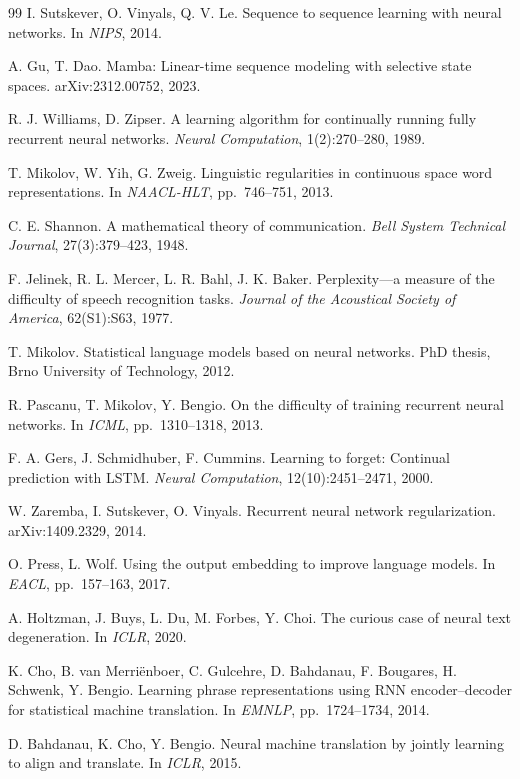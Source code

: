 \documentclass[11pt,a4paper]{article}
\begin{document}
\begin{thebibliography}{99}
 I. Sutskever, O. Vinyals, Q. V. Le.
Sequence to sequence learning with neural networks.
In \emph{NIPS}, 2014.

 A. Gu, T. Dao.
Mamba: Linear-time sequence modeling with selective state spaces.
arXiv:2312.00752, 2023.

 R. J. Williams, D. Zipser.
A learning algorithm for continually running fully recurrent neural networks.
\emph{Neural Computation}, 1(2):270--280, 1989.

 T. Mikolov, W. Yih, G. Zweig.
Linguistic regularities in continuous space word representations.
In \emph{NAACL-HLT}, pp.~746--751, 2013.

 C. E. Shannon.
A mathematical theory of communication.
\emph{Bell System Technical Journal}, 27(3):379--423, 1948.

 F. Jelinek, R. L. Mercer, L. R. Bahl, J. K. Baker.
Perplexity---a measure of the difficulty of speech recognition tasks.
\emph{Journal of the Acoustical Society of America}, 62(S1):S63, 1977.

 T. Mikolov.
Statistical language models based on neural networks.
PhD thesis, Brno University of Technology, 2012.

 R. Pascanu, T. Mikolov, Y. Bengio.
On the difficulty of training recurrent neural networks.
In \emph{ICML}, pp.~1310--1318, 2013.

 F. A. Gers, J. Schmidhuber, F. Cummins.
Learning to forget: Continual prediction with LSTM.
\emph{Neural Computation}, 12(10):2451--2471, 2000.

 W. Zaremba, I. Sutskever, O. Vinyals.
Recurrent neural network regularization.
arXiv:1409.2329, 2014.

 O. Press, L. Wolf.
Using the output embedding to improve language models.
In \emph{EACL}, pp.~157--163, 2017.

 A. Holtzman, J. Buys, L. Du, M. Forbes, Y. Choi.
The curious case of neural text degeneration.
In \emph{ICLR}, 2020.

 K. Cho, B. van Merri\"enboer, C. Gulcehre, D. Bahdanau, F. Bougares, H. Schwenk, Y. Bengio.
Learning phrase representations using RNN encoder--decoder for statistical machine translation.
In \emph{EMNLP}, pp.~1724--1734, 2014.

 D. Bahdanau, K. Cho, Y. Bengio.
Neural machine translation by jointly learning to align and translate.
In \emph{ICLR}, 2015.


\end{thebibliography}
\end{document}
